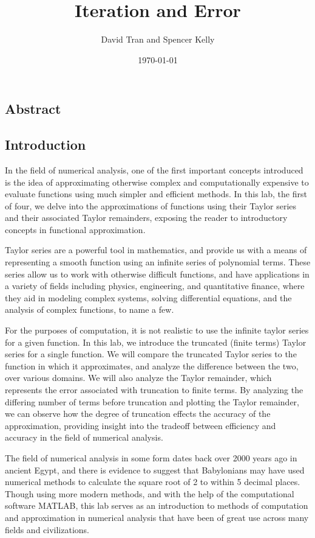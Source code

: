 \documentclass[letter,11pt]{article}
\title{Iteration and Error}
\author{David Tran and Spencer Kelly}
\date{\today}
\begin{document}
\maketitle

\subsection*{Abstract}

\subsection*{Introduction}
In the field of numerical analysis, one of the first important concepts introduced is the idea of approximating otherwise complex and computationally expensive to evaluate functions using much simpler and efficient methods.
In this lab, the first of four, we delve into the approximations of functions using their Taylor series and their associated Taylor remainders, exposing the reader to introductory concepts in functional approximation.

Taylor series are a powerful tool in mathematics, and provide us with a means of representing a smooth function using an infinite series of polynomial terms.
These series allow us to work with otherwise difficult functions, and have applications in a variety of fields including physics, engineering, and quantitative finance, where they aid in modeling complex systems, solving differential equations, and the analysis of complex functions, to name a few.

For the purposes of computation, it is not realistic to use the infinite taylor series for a given function.
In this lab, we introduce the truncated (finite terms) Taylor series for a single function.
We will compare the truncated Taylor series to the function in which it approximates, and analyze the difference between the two, over various domains.
We will also analyze the Taylor remainder, which represents the error associated with truncation to finite terms.
By analyzing the differing number of terms before truncation and plotting the Taylor remainder, we can observe how the degree of truncation effects the accuracy of the approximation, providing insight into the tradeoff between efficiency and accuracy in the field of numerical analysis.

The field of numerical analysis in some form dates back over 2000 years ago in ancient Egypt, and there is evidence to suggest that Babylonians may have used numerical methods to calculate the square root of 2 to within 5 decimal places.
Though using more modern methods, and with the help of the computational software MATLAB, this lab serves as an introduction to methods of computation and approximation in numerical analysis that have been of great use across many fields and civilizations.
\end{document}

